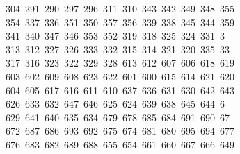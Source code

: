 \begin{tabbing}
\>\ 304\ 291\ 290\ 297\ 296\ 311\ 310\ 343\ 342\ 349\ 348\ 355\\[0pt]
\>\ 354\ 337\ 336\ 351\ 350\ 357\ 356\ 339\ 338\ 345\ 344\ 359\ \\[0pt]
\ 341\ 340\ 347\ 346\ 353\ 352\ 319\ 318\ 325\ 324\ 331\ 3\\[0pt]
\ 313\ 312\ 327\ 326\ 333\ 332\ 315\ 314\ 321\ 320\ 335\ 33\\[0pt]
\ 317\ 316\ 323\ 322\ 329\ 328\ 613\ 612\ 607\ 606\ 618\ 619\\[0pt]
\>\ 603\ 602\ 609\ 608\ 623\ 622\ 601\ 600\ 615\ 614\ 621\ 620\\[0pt]
\>\ 604\ 605\ 617\ 616\ 611\ 610\ 637\ 636\ 631\ 630\ 642\ 643\ \\[0pt]
\ 626\ 633\ 632\ 647\ 646\ 625\ 624\ 639\ 638\ 645\ 644\ 6\\[0pt]
\ 629\ 641\ 640\ 635\ 634\ 679\ 678\ 685\ 684\ 691\ 690\ 67\\[0pt]
\ 672\ 687\ 686\ 693\ 692\ 675\ 674\ 681\ 680\ 695\ 694\ 677\\[0pt]
\>\ 676\ 683\ 682\ 689\ 688\ 655\ 654\ 661\ 660\ 667\ 666\ 649\\[0pt]

\end{tabbing}
